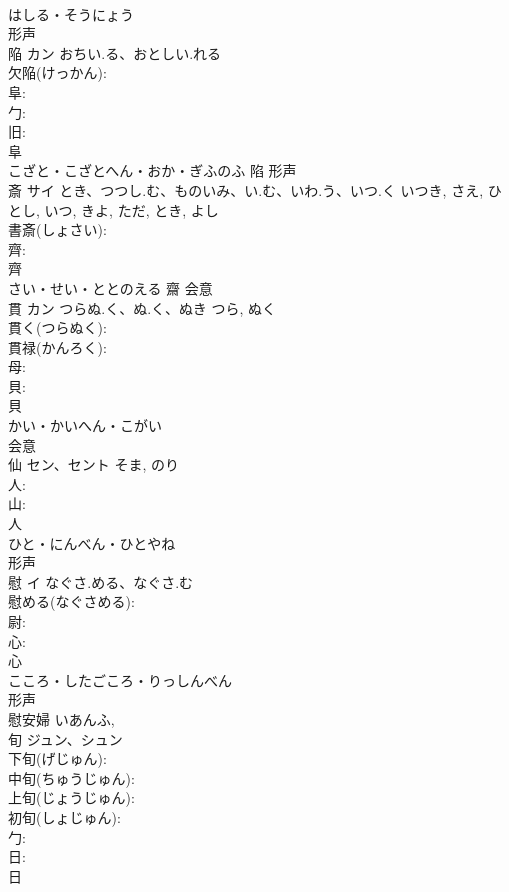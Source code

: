 \documentclass[8pt]{extreport}
\begin{document}
\begin{CJK}{UTF8}{min}
\\	はしる・そうにょう	
\\	形声 
\\	陥	カン	おちい.る、おとしい.れる		
\\	欠陥(けっかん): 
\\	阜: 
\\	勹: 
\\	旧: 
\\	阜	
\\	こざと・こざとへん・おか・ぎふのふ	陷	形声 
\\	斎	サイ	とき、つつし.む、ものいみ、い.む、いわ.う、いつ.く	いつき, さえ, ひとし, いつ, きよ, ただ, とき, よし	
\\	書斎(しょさい): 
\\	齊: 
\\	齊	
\\	さい・せい・ととのえる	齋	会意 
\\	貫	カン	つらぬ.く、ぬ.く、ぬき	つら, ぬく	
\\	貫く(つらぬく): 
\\	貫禄(かんろく): 
\\	母: 
\\	貝: 
\\	貝	
\\	かい・かいへん・こがい	
\\	会意 
\\	仙	セン、セント		そま, のり	
\\	人: 
\\	山: 
\\	人	
\\	ひと・にんべん・ひとやね	
\\	形声 
\\	慰	イ	なぐさ.める、なぐさ.む		
\\	慰める(なぐさめる): 
\\	尉: 
\\	心: 
\\	心	
\\	こころ・したごころ・りっしんべん	
\\	形声 
\\	慰安婦 いあんふ, 
\\	旬	ジュン、シュン			
\\	下旬(げじゅん): 
\\	中旬(ちゅうじゅん): 
\\	上旬(じょうじゅん): 
\\	初旬(しょじゅん): 
\\	勹: 
\\	日: 
\\	日	

\end{CJK}
\end{document}
